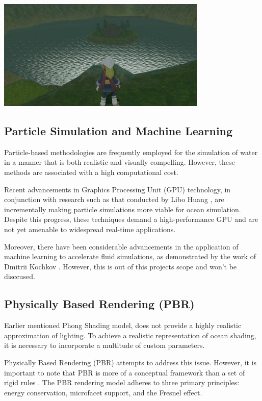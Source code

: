 \begin{minipage}{1\textwidth}
    \centering
    \includegraphics[width=0.75\textwidth]{"images/pokemon_water_tiling.png"}
    \label{fig:pokemon_water_tiling}
\end{minipage}

\subsection{Particle Simulation and Machine Learning}
Particle-based methodologies are frequently employed for the simulation of water in a manner that is both realistic and visually compelling. However, these methods are associated with a high computational cost.

Recent advancements in Graphics Processing Unit (GPU) technology, in conjunction with research such as that conducted by Libo Huang \cite{huang2021}, are incrementally making particle simulations more viable for ocean simulation. Despite this progress, these techniques demand a high-performance GPU and are not yet amenable to widespread real-time applications.

Moreover, there have been considerable advancements in the application of machine learning to accelerate fluid simulations, as demonstrated by the work of Dmitrii Kochkov \cite{kochkov2021machine}. However, this is out of this projects scope and won't be disccused.

\subsection{Physically Based Rendering (PBR)}
Earlier mentioned Phong Shading model, does not provide a highly realistic approximation of lighting. To achieve a realistic representation of ocean shading, it is necessary to incorporate a multitude of custom parameters.

Physically Based Rendering (PBR) attempts to address this issue. However, it is important to note that PBR is more of a conceptual framework than a set of rigid rules \cite[Joe Wilson, 2017]{wilson2017}. The PBR rendering model adheres to three primary principles: energy conservation, microfacet support, and the Fresnel effect.

